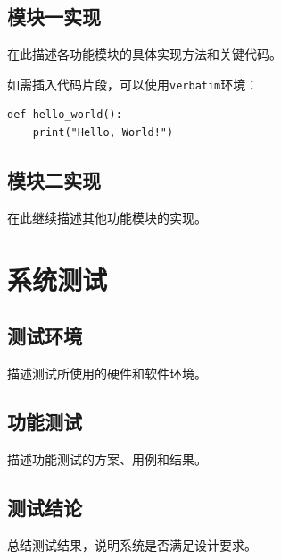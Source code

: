 \subsection{模块一实现}

在此描述各功能模块的具体实现方法和关键代码。

如需插入代码片段，可以使用\verb|verbatim|环境：

\begin{verbatim}
def hello_world():
    print("Hello, World!")
\end{verbatim}

\subsection{模块二实现}

在此继续描述其他功能模块的实现。

\section{系统测试}

\subsection{测试环境}

描述测试所使用的硬件和软件环境。

\subsection{功能测试}

描述功能测试的方案、用例和结果。

\subsection{测试结论}

总结测试结果，说明系统是否满足设计要求。
